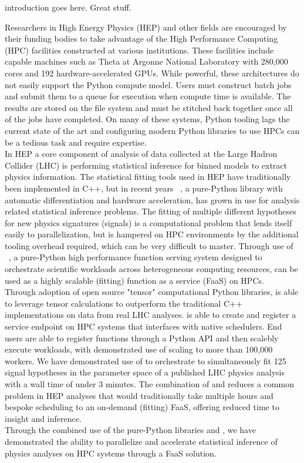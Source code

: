 introduction goes here.
Great stuff.~\cite{ATL-PHYS-PUB-2019-029}

Researchers in High Energy Physics (HEP) and other fields are encouraged by their funding bodies to take advantage of the High Performance Computing (HPC) facilities constructed at various institutions.
These facilities include capable machines such as Theta at Argonne National Laboratory with 280,000 cores and 192 hardware-accelerated GPUs.
While powerful, these architectures do not easily support the Python compute model.
Users must construct batch jobs and submit them to a queue for execution when compute time is available.
The results are stored on the file system and must be stitched back together once all of the jobs have completed.
On many of these systems, Python tooling lags the current state of the art and configuring modern Python libraries to use HPCs can be a tedious task and require expertise.\\

In HEP a core component of analysis of data collected at the Large Hadron Collider (LHC) is performing statistical inference for binned models to extract physics information.
The statistical fitting tools used in HEP have traditionally been implemented in C++, but in recent years \pyhf{}~\cite{pyhf,pyhf_joss}, a pure-Python library with automatic differentiation and hardware acceleration, has grown in use for analysis related statistical inference problems.
The fitting of multiple different hypotheses for new physics signatures (signals) is a computational problem that lends itself easily to parallelization, but is hampered on HPC environments by the additional tooling overhead required, which can be very difficult to master.
Through use of \funcX{}~\cite{funcX_paper}, a pure-Python high performance function serving system designed to orchestrate scientific workloads across heterogeneous computing resources, \pyhf{} can be used as a highly scalable (fitting) function as a service (FaaS) on HPCs.\\

Through adoption of open source "tensor" computational Python libraries, \pyhf{} is able to leverage tensor calculations to outperform the traditional C++ implementations on data from real LHC analyses.
\funcX{} is able to create and register a service endpoint on HPC systems that interfaces with native schedulers.
End users are able to register functions through a Python API and then scalebly execute workloads, with demonstrated use of scaling to more than 100,000 workers.
We have demonstrated use of \funcX{} to orchestrate \pyhf{} to simultaneously fit 125 signal hypotheses in the parameter space of a published LHC physics analysis with a wall time of under 3 minutes.
The combination of \pyhf{} and \funcX{} reduces a common problem in HEP analyses that would traditionally take multiple hours and bespoke scheduling to an on-demand (fitting) FaaS, offering reduced time to insight and inference.\\

Through the combined use of the pure-Python libraries \funcX{} and \pyhf{}, we have demonstrated the ability to parallelize and accelerate statistical inference of physics analyses on HPC systems through a FaaS solution.
